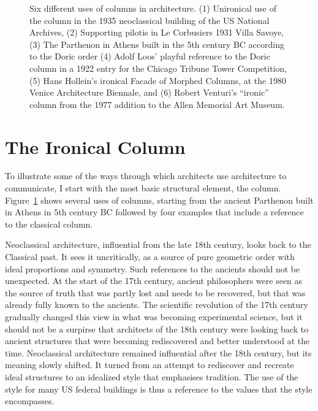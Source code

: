 \begin{figure}
\caption{Six different uses of columns in architecture. (1) Unironical use of the column in the 1935
neoclassical building of the US National Archives, (2) Supporting pilotis in Le Corbusiers 1931
Villa Savoye, (3) The Parthenon in Athens built in the 5th century BC according to the Doric order
(4) Adolf Loos' playful reference to the Doric column in a 1922 entry for the Chicago Tribune
Tower Competition, (5) Hans Hollein's ironical Facade of Morphed Columns, at the 1980 Venice
Architecture Biennale, and (6) Robert Venturi's ``ironic'' column from the 1977 addition to the
Allen Memorial Art Museum.}
\label{fig:columns}
\end{figure}

\section{The Ironical Column}
To illustrate some of the ways through which architects use architecture to communicate,
I start with the most basic structural element, the column. Figure~\ref{fig:columns} shows
several uses of columns, starting from the ancient Parthenon built in Athens in 5th century
BC followed by four examples that include a reference to the classical column.

Neoclassical architecture, influential from the late 18th century, looks back to the Classical
past. It sees it uncritically, as a source of pure geometric order with ideal proportions and
symmetry. Such references to the ancients should not be unexpected. At the start of the 17th
century, ancient philosophers were seen as the source of truth that was partly lost and needs
to be recovered, but that was already fully known to the ancients. The
scientific revolution of the 17th century gradually changed this view in what was becoming
experimental science, but it should not be a surpirse that architects of the 18th century were
looking back to ancient structures that were becoming rediscovered and better understood at the
time. Neoclassical architecture remained influential after the 18th century, but its meaning
slowly shifted. It turned from an attempt to rediscover and recreate ideal structures to an
idealized style that emphasises tradition. The use of the style for many US federal buildings
is thus a reference to the values that the style encompasses.

